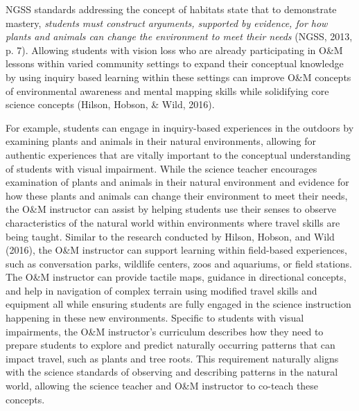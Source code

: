 \documentclass[11.5pt]{sig-alternate} %
\begin{document}
\begin{large}
NGSS standards addressing the concept of habitats state that to demonstrate mastery, \textit{students must construct arguments, supported by evidence, for how plants and animals can change the environment to meet their needs} (NGSS, 2013, p. 7).  Allowing students with vision loss who are already participating in O\&M lessons within varied community settings to expand their conceptual knowledge by using inquiry based learning within these settings can improve O\&M concepts of environmental awareness and mental mapping skills while solidifying core science concepts (Hilson, Hobson, \& Wild, 2016).
	
 For example, students can engage in inquiry-based experiences in the outdoors by examining plants and animals in their natural environments, allowing for authentic experiences that are vitally important to the conceptual understanding of students with visual impairment. While the science teacher encourages examination of plants and animals in their natural environment and evidence for how these plants and animals can change their environment to meet their needs, the O\&M instructor can assist by helping students use their senses to observe characteristics of the natural world within environments where travel skills are being taught.  Similar to the research conducted by Hilson, Hobson, and Wild (2016), the O\&M instructor can support learning within field-based experiences, such as conversation parks, wildlife centers, zoos and aquariums, or field stations.  The O\&M instructor can provide tactile maps, guidance in directional concepts, and help in navigation of complex terrain using modified travel skills and equipment all while ensuring students are fully engaged in the science instruction happening in these new environments.  Specific to students with visual impairments, the O\&M instructor’s curriculum describes how they need to prepare students to explore and predict naturally occurring patterns that can impact travel, such as plants and tree roots.  This requirement naturally aligns with the science standards of observing and describing patterns in the natural world, allowing the science teacher and O\&M instructor to co-teach these concepts.
 

\end{large}
\end{document}
